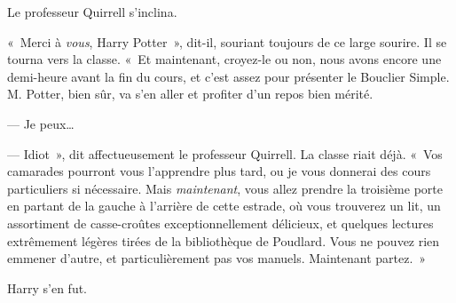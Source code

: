 Le professeur Quirrell s'inclina.

«~Merci à \emph{vous}, Harry Potter~», dit-il, souriant toujours de ce large sourire.
Il se tourna vers la classe.
«~Et maintenant, croyez-le ou non, nous avons encore une demi-heure avant la fin du cours, et c'est assez pour présenter le Bouclier Simple.
M. Potter, bien sûr, va s'en aller et profiter d'un repos bien mérité.

--- Je peux…

--- Idiot~», dit affectueusement le professeur Quirrell.
La classe riait déjà.
«~Vos camarades pourront vous l'apprendre plus tard, ou je vous donnerai des cours particuliers si nécessaire.
Mais \emph{maintenant}, vous allez prendre la troisième porte en partant de la gauche à l'arrière de cette estrade, où vous trouverez un lit, un assortiment de casse-croûtes exceptionnellement délicieux, et quelques lectures extrêmement légères tirées de la bibliothèque de Poudlard.
Vous ne pouvez rien emmener d'autre, et particulièrement pas vos manuels.
Maintenant partez.~»

Harry s'en fut.
